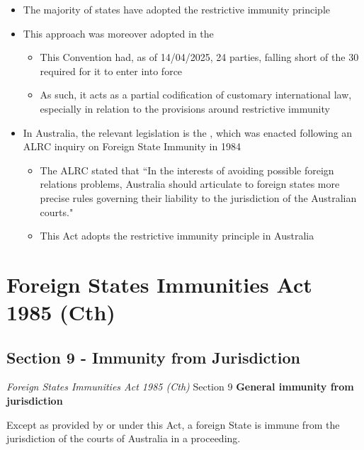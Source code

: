 \begin{itemize}
    \item The majority of states have adopted the restrictive immunity principle
    \item This approach was moreover adopted in the 
    \begin{itemize}
        \item This Convention had, as of 14/04/2025, 24 parties, falling short of the 30 required for it to enter into force
        \item As such, it acts as a partial codification of customary international law, especially in relation to the provisions around restrictive immunity
    \end{itemize}
    \item In Australia, the relevant legislation is the , which was enacted following an ALRC inquiry on Foreign State Immunity in 1984
    \begin{itemize}
        \item The ALRC stated that ``In the interests of avoiding possible foreign relations problems, Australia should articulate to foreign states more precise rules governing their liability to the jurisdiction of the Australian courts."
        \item This Act adopts the restrictive immunity principle in Australia
    \end{itemize}
\end{itemize}

\section{Foreign States Immunities Act 1985 (Cth)}

\subsection{Section 9 - Immunity from Jurisdiction}
\begin{statutedetails}{\textit{Foreign States Immunities Act 1985 (Cth)} Section 9}
    \flushleft
    \textbf{General immunity from jurisdiction}

    \vspace{\baselineskip}

    Except as provided by or under this Act, a foreign State is immune from the jurisdiction of the courts of Australia in a proceeding.
\end{statutedetails}

